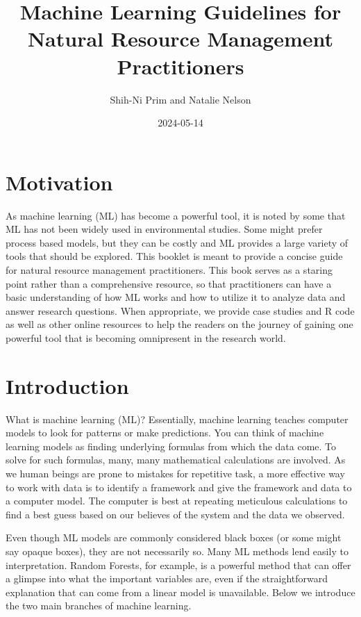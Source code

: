 \documentclass[
]{book}
\title{Machine Learning Guidelines for Natural Resource Management Practitioners}
\author{Shih-Ni Prim and Natalie Nelson}
\date{2024-05-14}
\begin{document}
\maketitle

{
\setcounter{tocdepth}{1}
\tableofcontents
}
\hypertarget{motivation}{%
\chapter{Motivation}\label{motivation}}

As machine learning (ML) has become a powerful tool, it is noted by some that ML has not been widely used in environmental studies. Some might prefer process based models, but they can be costly and ML provides a large variety of tools that should be explored. This booklet is meant to provide a concise guide for natural resource management practitioners. This book serves as a staring point rather than a comprehensive resource, so that practitioners can have a basic understanding of how ML works and how to utilize it to analyze data and answer research questions. When appropriate, we provide case studies and R code as well as other online resources to help the readers on the journey of gaining one powerful tool that is becoming omnipresent in the research world.

\hypertarget{intro}{%
\chapter{Introduction}\label{intro}}

What is machine learning (ML)? Essentially, machine learning teaches computer models to look for patterns or make predictions. You can think of machine learning models as finding underlying formulas from which the data come. To solve for such formulas, many, many mathematical calculations are involved. As we human beings are prone to mistakes for repetitive task, a more effective way to work with data is to identify a framework and give the framework and data to a computer model. The computer is best at repeating meticulous calculations to find a best guess based on our believes of the system and the data we observed.

Even though ML models are commonly considered black boxes (or some might say opaque boxes), they are not necessarily so. Many ML methods lend easily to interpretation. Random Forests, for example, is a powerful method that can offer a glimpse into what the important variables are, even if the straightforward explanation that can come from a linear model is unavailable. Below we introduce the two main branches of machine learning.
\end{document}
